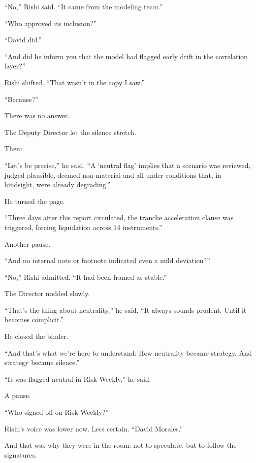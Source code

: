 “No,” Rishi said. “It came from the modeling team.”

“Who approved its inclusion?”

“David did.”

“And did he inform you that the model had flagged early drift in the correlation layer?”

Rishi shifted. “That wasn’t in the copy I saw.”

“Because?”

There was no answer.

The Deputy Director let the silence stretch.

Then:

“Let’s be precise,” he said. “A ‘neutral flag’ implies that a scenario was reviewed, judged plausible, deemed 
non-material and all under conditions that, in hindsight, were already degrading.”

He turned the page.

“Three days after this report circulated, the tranche acceleration clause was triggered, forcing liquidation across 
14 instruments.”

Another pause.

“And no internal note or footnote indicated even a mild deviation?”

“No,” Rishi admitted. “It had been framed as stable.”

The Director nodded slowly.

“That’s the thing about neutrality,” he said. “It always sounds prudent. Until it becomes complicit.”

He closed the binder.

“And that’s what we’re here to understand:
How neutrality became strategy.
And strategy became silence.”

“It was flagged neutral in Risk Weekly,” he said.

A pause.

“Who signed off on Risk Weekly?”

Rishi’s voice was lower now. Less certain.
“David Morales.”

And that was why they were in the room: not to speculate, but to follow the signatures.

\medskip

